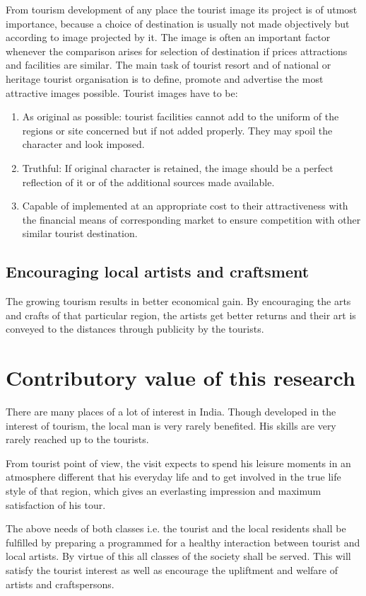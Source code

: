 From tourism development of any place the tourist image its project is of utmost importance, because a choice of destination is usually not made objectively but according to image projected by it. The image is often an important factor whenever the comparison arises for selection of destination if prices attractions and facilities are similar. The main task of tourist resort and of national or heritage tourist organisation is to define, promote and advertise the most attractive images possible. Tourist images have to be:

\begin{enumerate}
  \item As original as possible: tourist facilities cannot add to the uniform of the regions or site concerned but if not added properly. They may spoil the character and look imposed.
  \item Truthful: If original character is retained, the image should be a perfect reflection of it or of the additional sources made available.
  \item Capable of implemented at an appropriate cost to their attractiveness with the financial means of corresponding market to ensure competition with other similar tourist destination.
\end{enumerate} 


\subsection{Encouraging local artists and craftsment} %
\label{sub:encor}

The growing tourism results in better economical gain. By encouraging the arts and crafts of that particular region, the artists get better returns and their art is conveyed to the distances through publicity by the tourists.



\section{Contributory value of this research} %
\label{sec:cvalue}

There are many places of a lot of interest in India. Though developed in the interest of tourism, the local man is very rarely benefited. His skills are very rarely reached up to the tourists.

From tourist point of view, the visit expects to spend his leisure moments in an atmosphere different that his everyday life and to get involved in the true life style of that region, which gives an everlasting impression and maximum satisfaction of his tour.

The above needs of both classes i.e. the tourist and the local residents shall be fulfilled by preparing a programmed for a healthy interaction between tourist and local artists. By virtue of this all classes of the society shall be served. This will satisfy the tourist interest as well as encourage the upliftment and welfare of artists and craftspersons.

